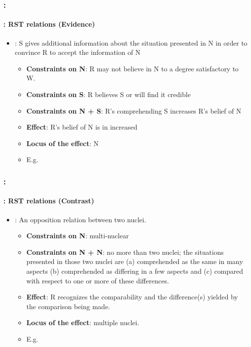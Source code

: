 \documentclass[xcolor=table]{beamer}
\begin{document}
\begin{frame}
	\frametitle{\insertshortsubtitle: \insertsection}
	\framesubtitle{\insertsubsection: RST relations (Evidence)}
	
	\begin{itemize}
		\item {}: S gives additional information about the situation presented in N in order to convince R to accept the information of N
		\begin{itemize}
			\item \textbf{Constraints on N}: R may not believe in N to a degree satisfactory to W.
			\item \textbf{Constraints on S}: R believes S or will find it credible
			\item \textbf{Constraints on N + S}: R's comprehending S increases R's belief of N
			\item \textbf{Effect}: R's belief of N is in increased
			\item \textbf{Locus of the effect}: N
			\item E.g. 
		\end{itemize}
	\end{itemize}
	
\end{frame}

\begin{frame}
	\frametitle{\insertshortsubtitle: \insertsection}
	\framesubtitle{\insertsubsection: RST relations (Contrast)}
	
	\begin{itemize}
		\item {}: An opposition relation between two nuclei.
		\begin{itemize}
			\item \textbf{Constraints on N}: multi-nuclear
			\item \textbf{Constraints on N + N}: no more than two nuclei; the situations presented in those two nuclei are (a) comprehended as the same in many aspects (b) comprehended as differing in a few aspects and (c) compared with respect to one or more of these differences.
			\item \textbf{Effect}: R recognizes the comparability and the difference(s) yielded by the comparison being made.
			\item \textbf{Locus of the effect}: multiple nuclei.
			\item E.g. 
		\end{itemize}
	\end{itemize}
	
\end{frame}
\end{document}
